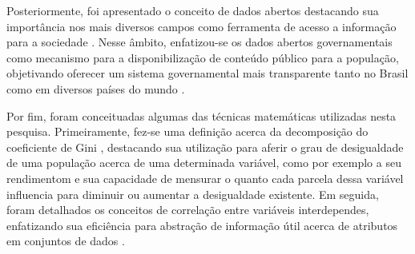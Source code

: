 Posteriormente, foi apresentado o conceito de dados abertos destacando sua importância nos mais diversos campos como ferramenta de acesso a informação para a sociedade \cite{cap02_ref4}. Nesse âmbito, enfatizou-se os dados abertos governamentais como mecanismo para a disponibilização de conteúdo público para a população, objetivando oferecer um sistema governamental mais transparente tanto no Brasil como em diversos países do mundo \cite{cap02_ref25}.

Por fim, foram conceituadas algumas das técnicas matemáticas utilizadas nesta pesquisa. Primeiramente, fez-se uma definição acerca da decomposição do coeficiente de Gini \cite{cap02_ref19}, destacando sua utilização para aferir o grau de desigualdade de uma população acerca de uma determinada variável, como por exemplo a seu rendimentom e sua capacidade de mensurar o quanto cada parcela dessa variável influencia para diminuir ou aumentar a desigualdade existente. Em seguida, foram detalhados os conceitos de correlação entre variáveis interdependes, enfatizando sua eficiência para abstração de informação útil acerca de atributos em conjuntos de dados \cite{cap02_ref39}.
